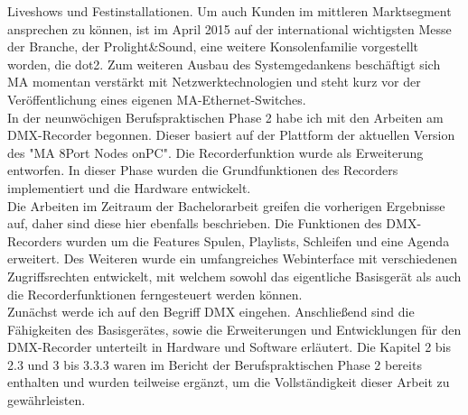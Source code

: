 \documentclass[11pt]{scrartcl}
\begin{document}
Liveshows und Festinstallationen. Um auch Kunden im mittleren Marktsegment ansprechen zu
können, ist im April 2015 auf der international wichtigsten Messe der Branche, der Prolight\&Sound,
eine weitere Konsolenfamilie vorgestellt worden, die dot2. Zum weiteren Ausbau des
Systemgedankens beschäftigt sich MA momentan verstärkt mit Netzwerktechnologien und steht kurz
vor der Veröffentlichung eines eigenen MA-Ethernet-Switches.\\
In der neunwöchigen Berufspraktischen Phase 2 habe ich mit den Arbeiten am DMX-Recorder
begonnen. Dieser basiert auf der Plattform der aktuellen Version des "MA 8Port Nodes onPC". Die
Recorderfunktion wurde als Erweiterung entworfen. In dieser Phase wurden die Grundfunktionen
des Recorders implementiert und die Hardware entwickelt.\\
Die Arbeiten im Zeitraum der Bachelorarbeit greifen die vorherigen Ergebnisse auf, daher sind diese
hier ebenfalls beschrieben. Die Funktionen des DMX-Recorders wurden um die Features Spulen,
Playlists, Schleifen und eine Agenda erweitert. Des Weiteren wurde ein umfangreiches Webinterface
mit verschiedenen Zugriffsrechten entwickelt, mit welchem sowohl das eigentliche Basisgerät als
auch die Recorderfunktionen ferngesteuert werden können.\\
Zunächst werde ich auf den Begriff DMX eingehen. Anschließend sind die Fähigkeiten des
Basisgerätes, sowie die Erweiterungen und Entwicklungen für den DMX-Recorder unterteilt in
Hardware und Software erläutert. Die Kapitel 2 bis 2.3 und 3 bis 3.3.3 waren im Bericht der
Berufspraktischen Phase 2 bereits enthalten und wurden teilweise ergänzt, um die Vollständigkeit
dieser Arbeit zu gewährleisten.\\
\end{document}
